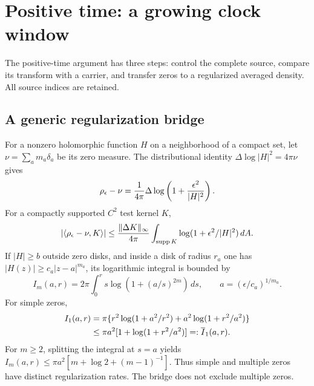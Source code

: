 \section{Positive time: a growing clock window}\label{sec:positive}
The positive-time argument has three steps: control the complete source,
compare its transform with a carrier, and transfer zeros to a regularized
averaged density. All source indices are retained.

\subsection{A generic regularization bridge}
For a nonzero holomorphic function $H$ on a neighborhood of a compact
set, let $\nu=\sum_a m_a\delta_a$ be its zero measure.
The distributional identity $\Delta\log|H|^2=4\pi\nu$ gives
\begin{equation}
 \rho_\epsilon-\nu=\frac1{4\pi}\Delta
       \log\left(1+\frac{\epsilon^2}{|H|^2}\right).
 \label{eq:bridge}
\end{equation}
For a compactly supported $C^2$ test kernel $K$,
\begin{equation}
 |\langle\rho_\epsilon-\nu,K\rangle|
 \le\frac{\|\Delta K\|_\infty}{4\pi}
      \int_{\operatorname{supp} K}\log(1+\epsilon^2/|H|^2)\,dA .
 \label{eq:bridgebound}
\end{equation}
If $|H|\ge b$ outside zero disks, and inside a disk of radius $r_a$
one has $|H(z)|\ge c_a|z-a|^{m_a}$, its logarithmic integral is bounded
by
\[
 I_m(a,r)=2\pi\int_0^r s\log(1+(a/s)^{2m})\,ds,\qquad
 a=(\epsilon/c_a)^{1/m_a}.
\]
For simple zeros,
\begin{align}
 I_1(a,r)&=\pi\{r^2\log(1+a^2/r^2)
                 +a^2\log(1+r^2/a^2)\}\notag\\
 &\le \pi a^2[1+\log(1+r^2/a^2)] =:\overline I_1(a,r).
 \label{eq:I1}
\end{align}
For $m\ge2$, splitting the integral at $s=a$ yields
$I_m(a,r)\le\pi a^2[m+\log2+(m-1)^{-1}]$.
Thus simple and multiple zeros have distinct regularization rates.
The bridge does not exclude multiple zeros.

